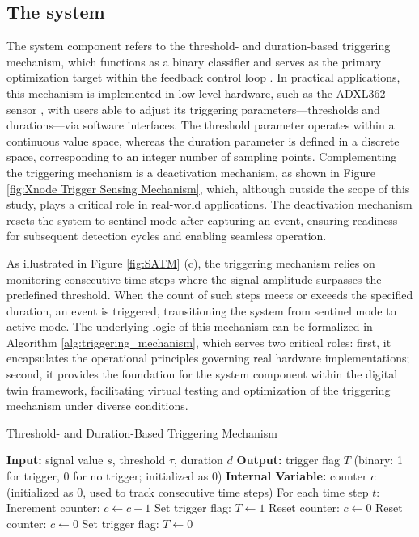 \documentclass[a4paper,fleqn,numbers,sort&compress]{cas-sc}
\begin{document}
\subsection{The system}
\label{component-system}

The system component refers to the threshold- and duration-based triggering mechanism, which functions as a binary classifier and serves as the primary optimization target within the feedback control loop \citep{fu_suddenevent_2019}. In practical applications, this mechanism is implemented in low-level hardware, such as the ADXL362 sensor \citep{analogdevices_adxl362_2024}, with users able to adjust its triggering parameters—thresholds and durations—via software interfaces. The threshold parameter operates within a continuous value space, whereas the duration parameter is defined in a discrete space, corresponding to an integer number of sampling points. Complementing the triggering mechanism is a deactivation mechanism, as shown in Figure \ref{fig:Xnode Trigger Sensing Mechanism}, which, although outside the scope of this study, plays a critical role in real-world applications. The deactivation mechanism resets the system to sentinel mode after capturing an event, ensuring readiness for subsequent detection cycles and enabling seamless operation.

As illustrated in Figure \ref{fig:SATM} (c), the triggering mechanism relies on monitoring consecutive time steps where the signal amplitude surpasses the predefined threshold. When the count of such steps meets or exceeds the specified duration, an event is triggered, transitioning the system from sentinel mode to active mode. The underlying logic of this mechanism can be formalized in Algorithm \ref{alg:triggering_mechanism}, which serves two critical roles: first, it encapsulates the operational principles governing real hardware implementations; second, it provides the foundation for the system component within the digital twin framework, facilitating virtual testing and optimization of the triggering mechanism under diverse conditions. 

\begin{algorithm}[H]
    \caption{Threshold- and Duration-Based Triggering Mechanism}
    \label{alg:triggering_mechanism}
    \begin{algorithmic}[1]
    \STATE \textbf{Input:} signal value $s$, threshold $\tau$, duration $d$
    \STATE \textbf{Output:} trigger flag $T$ (binary: 1 for trigger, 0 for no trigger; initialized as 0)
    \STATE \textbf{Internal Variable:} counter $c$ (initialized as 0, used to track consecutive time steps)
    \STATE For each time step $t$:
            \STATE Increment counter: $c \gets c + 1$
                \STATE Set trigger flag: $T \gets 1$
                \STATE Reset counter: $c \gets 0$
            \ENDIF
        \ELSE
            \STATE Reset counter: $c \gets 0$
            \STATE Set trigger flag: $T \gets 0$
        \ENDIF
    \end{algorithmic}
\end{algorithm}
\end{document}
